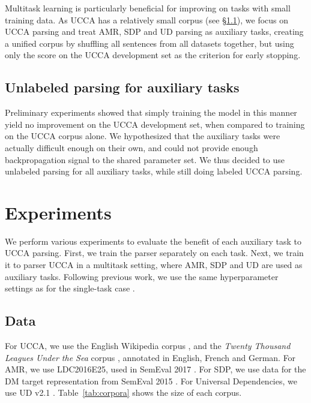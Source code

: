 \documentclass[11pt,a4paper]{article}
\begin{document}
Multitask learning is particularly beneficial for improving on tasks with small training data.
As UCCA has a relatively small corpus (see \S\ref{sec:data}),
we focus on UCCA parsing and treat AMR, SDP and UD parsing
as auxiliary tasks, creating a unified corpus by shuffling all sentences from all datasets together,
but using only the score on the UCCA development set as the criterion for early stopping.

\subsection{Unlabeled parsing for auxiliary tasks}\label{sec:unlabeled_aux}

Preliminary experiments showed that simply training the model in this manner yield no improvement
on the UCCA development set, when compared to training on the UCCA corpus alone.
We hypothesized that the auxiliary tasks were actually difficult enough on their own,
and could not provide enough backpropagation signal to the shared parameter set.
We thus decided to use unlabeled parsing for all auxiliary tasks, while still doing labeled UCCA parsing.


\section{Experiments}\label{sec:experiments}

We perform various experiments to evaluate the benefit of each auxiliary task to UCCA parsing.
First, we train the parser separately on each task.
Next, we train it to parser UCCA in a multitask setting, where AMR, SDP and UD are used as
auxiliary tasks. Following previous work, we use the same hyperparameter settings
as for the single-task case \cite{N16-1179,P16-2038,C16-1013,C16-1059,C16-1179,E17-1005}.

\subsection{Data}\label{sec:data}

For UCCA, we use the English Wikipedia corpus \cite{abend2013universal},
and the \textit{Twenty Thousand Leagues Under the Sea} corpus \cite[20K leagues;][]{sulem2015conceptual},
annotated in English, French and German.
For AMR, we use LDC2016E25, used in SemEval 2017 \cite{may2017semeval}.
For SDP, we use data for the DM target representation from SemEval 2015 \cite{oepen2015semeval}.
For Universal Dependencies, we use UD v2.1 \cite{11234/1-2515}.
Table~\ref{tab:corpora} shows the size of each corpus.
\end{document}
